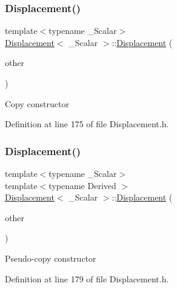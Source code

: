 \subsubsection{\texorpdfstring{Displacement()}{Displacement()}\hspace{0.1cm}{\footnotesize\ttfamily [2/7]}}
{\footnotesize\ttfamily template$<$typename \+\_\+\+Scalar$>$ \\
\hyperlink{class_displacement}{Displacement}$<$ \+\_\+\+Scalar $>$\+::\hyperlink{class_displacement}{Displacement} (\begin{DoxyParamCaption}\item[{const \hyperlink{class_displacement}{Displacement}$<$ \+\_\+\+Scalar $>$ \&}]{other }\end{DoxyParamCaption})\hspace{0.3cm}{\ttfamily [inline]}}

Copy constructor 

Definition at line 175 of file Displacement.\+h.

\hypertarget{class_displacement_a0bd84d9630e7a5c11304c07002d7ecc8}{}\label{class_displacement_a0bd84d9630e7a5c11304c07002d7ecc8} 
\subsubsection{\texorpdfstring{Displacement()}{Displacement()}\hspace{0.1cm}{\footnotesize\ttfamily [3/7]}}
{\footnotesize\ttfamily template$<$typename \+\_\+\+Scalar$>$ \\
template$<$typename Derived $>$ \\
\hyperlink{class_displacement}{Displacement}$<$ \+\_\+\+Scalar $>$\+::\hyperlink{class_displacement}{Displacement} (\begin{DoxyParamCaption}\item[{const \hyperlink{class_displacement_base}{Displacement\+Base}$<$ Derived $>$ \&}]{other }\end{DoxyParamCaption})\hspace{0.3cm}{\ttfamily [inline]}}

Pseudo-\/copy constructor 

Definition at line 179 of file Displacement.\+h.

\hypertarget{class_displacement_a252b0c985fe974b166d8d4b124ec0d5f}{}\label{class_displacement_a252b0c985fe974b166d8d4b124ec0d5f} 
